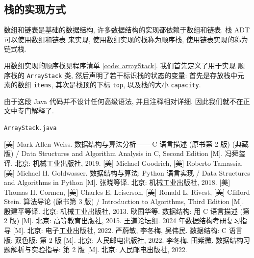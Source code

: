 \documentclass[10pt,UTF8]{book} %
\begin{document}
\subsection{栈的实现方式}

数组和链表是基础的数据结构, 许多数据结构的实现都依赖于数组和链表. 栈 ADT 可以使用数组和链表
来实现, 使用数组实现的栈称为顺序栈, 使用链表实现的称为链式栈.

用数组实现的顺序栈见程序清单 \ref{code: arrayStack}. 我们首先定义了用于实现
顺序栈的 \lstinline|ArrayStack| 类, 然后声明了若干标识栈的状态的变量: 首先是存放栈中元素的数组
\lstinline|items|, 其次是栈顶的下标 \lstinline|top|,
以及栈的大小 \lstinline|capacity|.

由于这段 Java 代码并不设计任何高级语法, 并且注释相对详细, 因此我们就不在正文中专门解释了.

\begin{code}
    \label{code: arrayStack}
    \lstinline|ArrayStack.java|
    
\end{code}



\onecolumn
\begin{thebibliography}{1}
    [美] Mark Allen Weiss. 数据结构与算法分析—— C 语言描述 (原书第 2 版)
    (典藏版) / Data Structures and Algorithm Analysis in C,
    Second Edition [M]. 冯舜玺译. 北京: 机械工业出版社, 2019.
    [美] Michael Goodrich, [美] Roberto Tamassia, 
    [美] Michael H. Goldwasser. 数据结构与算法: Python 语言实现
    / Data Structures and Algorithms in Python [M].
    张晓等译. 北京: 机械工业出版社, 2018.
    [美] Thomas H. Cormen, [美] Charles E. Leiserson,
    [美] Ronald L. Rivest, [美] Clifford Stein.
    算法导论 (原书第 3 版) / Introduction to Algorithms, Third Edition [M].
    殷建平等译. 北京: 机械工业出版社, 2013.
    耿国华等. 数据结构: 用 C 语言描述 (第 2 版) [M].
    北京: 高等教育出版社, 2015.
    王道论坛组. 2024 年数据结构考研复习指导 [M]. 北京: 电子工业出版社, 2022.
    严蔚敏, 李冬梅, 吴伟民. 数据结构: C 语言版: 双色版: 第 2 版 [M].
    北京: 人民邮电出版社, 2022.
    李冬梅, 田紫微. 数据结构习题解析与实验指导: 第 2 版 [M]. 北京: 人民邮电出版社, 2022.
\end{thebibliography}


\end{document}
